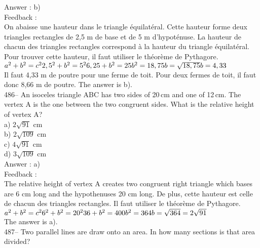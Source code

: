 ﻿\documentclass[letterpaper, 12pt]{article}
\begin{document}
Answer : b)\\

Feedback :\\
On abaisse une hauteur dans le triangle \'equilat\'eral.  Cette hauteur
forme deux triangles rectangles de 2,5 m de base et de 5 m d'hypot\'enuse.
La hauteur de chacun des triangles rectangles correspond \`a la hauteur du
triangle \'equilat\'eral.  Pour trouver cette hauteur, il faut utiliser le
th\'eor\`eme de Pythagore.\\

$a^{2}+b^{2}=c^{2}\\
2,5^{2}+b^{2}=5^{2}\\
6,25+b^{2}=25\\
b^{2}=18,75\\
b=\sqrt{18,75}\\
b=4,33$\\
Il faut 4,33 m de poutre pour une ferme de toit.  Pour deux fermes de toit,
il faut donc 8,66 m de poutre.  The answer is b).\\


486-- An isoceles triangle ABC has two sides of 20\,cm and one of 12\,cm. The vertex A is the one between the two congruent sides. What is the relative height of vertex A?\\
a) $2\sqrt{91}$ cm\\
b) $2\sqrt{109}$ cm\\
c) $4\sqrt{91}$ cm\\
d) $3\sqrt{109}$ cm\\

Answer : a)\\

Feedback : \\
The relative height of vertex A creates two congruent right triangle which bases are 6 cm long and the hypothenuses 20 cm long. De plus, cette
hauteur est celle de chacun des triangles rectangles.  Il faut utiliser le
th\'eor\`eme de Pythagore.\\
$a^{2}+b^{2}=c^{2}\\
6^{2}+b^{2}=20^{2}\\
36+b^{2}=400\\
b^{2}=364\\
b=\sqrt{364}=2\sqrt{91}$\\
The answer is a).\\

487-- Two parallel lines are draw onto an area. In how many sections is that area divided?\\
\end{document}
